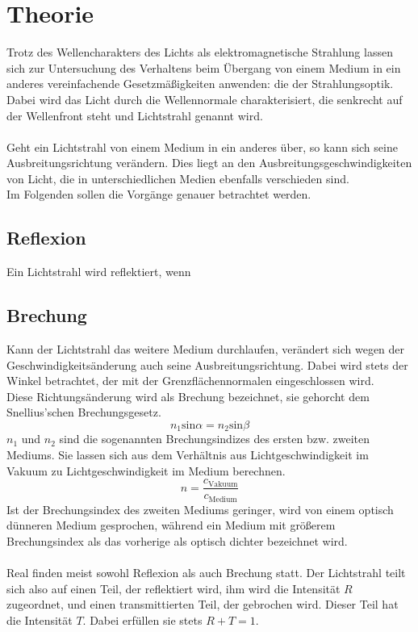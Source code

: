 \section{Theorie}
\label{sec:Theorie}
Trotz des Wellencharakters des Lichts als elektromagnetische Strahlung
lassen sich zur Untersuchung des Verhaltens beim Übergang von einem Medium
in ein anderes vereinfachende Gesetzmäßigkeiten anwenden: die der Strahlungsoptik.\\
Dabei wird das Licht durch die Wellennormale charakterisiert, die senkrecht auf der
Wellenfront steht und Lichtstrahl genannt wird.\\
\\
Geht ein Lichtstrahl von einem Medium in ein anderes über, so kann sich seine
Ausbreitungsrichtung verändern. Dies liegt an den Ausbreitungsgeschwindigkeiten
von Licht, die in unterschiedlichen Medien ebenfalls verschieden sind.\\
Im Folgenden sollen die Vorgänge genauer betrachtet werden.

\subsection{Reflexion}
Ein Lichtstrahl wird reflektiert, wenn 

\subsection{Brechung}
Kann der Lichtstrahl das weitere Medium durchlaufen, verändert sich wegen
der Geschwindigkeitsänderung auch seine Ausbreitungsrichtung. Dabei wird stets
der Winkel betrachtet, der mit der Grenzflächennormalen eingeschlossen wird.\\
Diese Richtungsänderung wird als Brechung bezeichnet, sie gehorcht dem Snellius'schen
Brechungsgesetz.
\begin{equation}
    n_1 \text{sin} \alpha = n_2 \text{sin} \beta
    \label{eqn:snellius}
\end{equation}
$n_1$ und $n_2$ sind die sogenannten Brechungsindizes des ersten bzw. zweiten
Mediums. Sie lassen sich aus dem Verhältnis aus Lichtgeschwindigkeit im Vakuum 
zu Lichtgeschwindigkeit im Medium berechnen.
\begin{equation}
    n = \frac{c_\text{Vakuum}}{c_\text{Medium}}
    \label{eqn:brech}
\end{equation}
Ist der Brechungsindex des zweiten Mediums geringer, wird von 
einem optisch dünneren Medium gesprochen, während ein Medium mit größerem
Brechungsindex als das vorherige als optisch dichter bezeichnet wird.\\
\\
Real finden meist sowohl Reflexion als auch Brechung statt. Der Lichtstrahl teilt
sich also auf einen Teil, der reflektiert wird, ihm wird die Intensität $R$ zugeordnet,
und einen transmittierten Teil, der gebrochen wird. Dieser Teil hat die
Intensität $T$. Dabei erfüllen sie stets $R + T = 1$.

